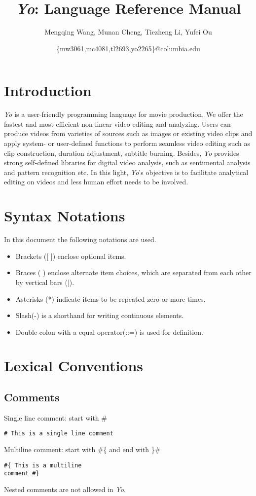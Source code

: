 \documentclass[12pt]{article}
\title{\textit{Yo}: Language Reference Manual}
\author{Mengqing Wang, Munan Cheng, Tiezheng Li, Yufei Ou}
\date{\{mw3061,mc4081,tl2693,yo2265\}@columbia.edu}
\begin{document}
\maketitle
\tableofcontents


\section{Introduction}

\textit{Yo} is a user-friendly programming language for movie production. We offer the fastest and most efficient non-linear video editing and analyzing. Users can produce videos from varieties of sources such as images or existing video clips and apply system- or user-defined functions to perform seamless video editing such as clip construction, duration adjustment, subtitle burning. Besides, \textit{Yo} provides strong self-defined libraries for digital video analysis, such as sentimental analysis and pattern recognition etc. In this light, \textit{Yo}'s objective is to facilitate analytical editing on videos and less human effort needs to be involved.


\section{Syntax Notations}
In this document the following notations are used. \\
\begin{itemize}
\item Brackets ([ ]) enclose optional items.
\item Braces ({ }) enclose alternate item choices, which are separated from each other by vertical bars (|).
\item Asterisks (*) indicate items to be repeated zero or more times.
\item Slash(-) is a shorthand for writing continuous elements. 
\item Double colon with a equal operator(::=) is used for definition.
\end{itemize}

\section{Lexical Conventions}
\subsection{Comments} %
Single line comment: start with \#
\begin{lstlisting}[caption=single line comment]
# This is a single line comment
\end{lstlisting}
Multiline comment: start with \#\{ and end with \}\#
\begin{lstlisting}[caption=multi-line comment]
#{ This is a multiline
comment #}
\end{lstlisting}
Nested comments are not allowed in \textit{Yo}.
\end{document}
